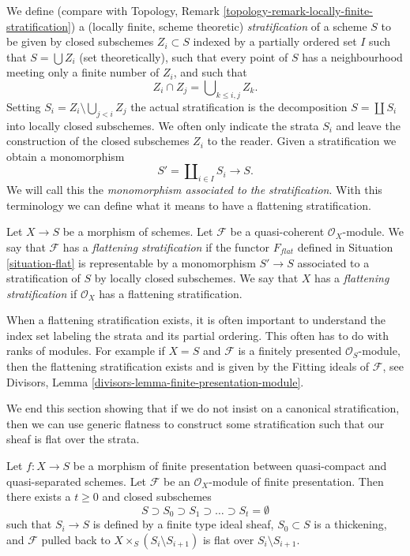 \noindent
We define (compare with
Topology, Remark \ref{topology-remark-locally-finite-stratification})
a (locally finite, scheme theoretic) {\it stratification} of a scheme $S$
to be given by closed subschemes $Z_i \subset S$ indexed by a
partially ordered set $I$ such that
$S = \bigcup Z_i$ (set theoretically), such that every point of $S$ has
a neighbourhood meeting only a finite number of $Z_i$, and such that
$$
Z_i \cap Z_j = \bigcup\nolimits_{k \leq i, j} Z_k.
$$
Setting $S_i = Z_i \setminus \bigcup_{j < i} Z_j$ the actual
stratification is the decomposition $S = \coprod S_i$ into
locally closed subschemes. We often only indicate the strata
$S_i$ and leave the construction of the closed subschemes $Z_i$
to the reader. Given a stratification we obtain a monomorphism
$$
S' = \coprod\nolimits_{i \in I} S_i \longrightarrow S.
$$
We will call this the {\it monomorphism associated to the stratification}.
With this terminology we can define what it means to have a flattening
stratification.

\begin{definition}
\label{definition-flattening-stratification}
Let $X \to S$ be a morphism of schemes.
Let $\mathcal{F}$ be a quasi-coherent $\mathcal{O}_X$-module.
We say that $\mathcal{F}$ has a {\it flattening stratification}
if the functor $F_{flat}$ defined in Situation \ref{situation-flat}
is representable by a monomorphism $S' \to S$ associated
to a stratification of $S$ by locally closed subschemes.
We say that $X$ has a {\it flattening stratification}
if $\mathcal{O}_X$ has a flattening stratification.
\end{definition}

\noindent
When a flattening stratification exists, it is often important
to understand the index set labeling the strata and its partial ordering.
This often has to do with ranks of modules. For example if
$X = S$ and $\mathcal{F}$ is a finitely presented $\mathcal{O}_S$-module,
then the flattening stratification exists and is given by the Fitting ideals
of $\mathcal{F}$, see
Divisors, Lemma \ref{divisors-lemma-finite-presentation-module}.

\medskip\noindent
We end this section showing that if we do not insist on a canonical
stratification, then we can use generic flatness to construct some
stratification such that our sheaf is flat over the strata.

\begin{lemma}
\label{lemma-generic-flatness-stratification}
Let $f : X \to S$ be a morphism of finite presentation between quasi-compact
and quasi-separated schemes. Let $\mathcal{F}$ be an $\mathcal{O}_X$-module
of finite presentation. Then there exists a $t \geq 0$ and closed
subschemes
$$
S \supset S_0 \supset S_1 \supset \ldots \supset S_t = \emptyset
$$
such that $S_i \to S$ is defined by a finite type ideal sheaf,
$S_0 \subset S$ is a thickening, and $\mathcal{F}$ pulled back to
$X \times_S (S_i \setminus S_{i + 1})$ is flat over $S_i \setminus S_{i + 1}$.
\end{lemma}

